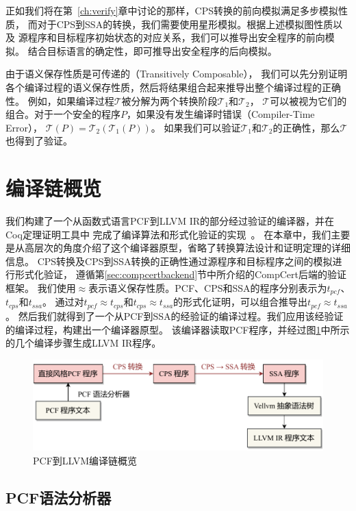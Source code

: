 正如我们将在第~\ref{ch:verify}章中讨论的那样，CPS转换的前向模拟满足多步模拟性质，
而对于CPS到SSA的转换，我们需要使用星形模拟。根据上述模拟图性质以及
源程序和目标程序初始状态的对应关系，我们可以推导出安全程序的前向模拟。
结合目标语言的确定性，即可推导出安全程序的后向模拟。

由于语义保存性质是可传递的（Transitively Composable），
我们可以先分别证明各个编译过程的语义保存性质，然后将结果组合起来推导出整个编译过程的正确性。
例如，如果编译过程$\mathcal{T}$被分解为两个转换阶段$\mathcal{T}_1$和$\mathcal{T}_2$，
$\mathcal{T}$可以被视为它们的组合。对于一个安全的程序$P$，如果没有发生编译时错误（Compiler-Time Error），
$\mathcal{T}(P) = \mathcal{T}_2(\mathcal{T}_1(P))$。
如果我们可以验证$\mathcal{T}_1$和$\mathcal{T}_2$的正确性，那么$\mathcal{T}$也得到了验证。

\section{编译链概览} \label{sec:overview}

我们构建了一个从函数式语言PCF到LLVM IR的部分经过验证的编译器，并在Coq定理证明工具中
完成了编译算法和形式化验证的实现~\cite{chlipala2022certified}。
在本章中，我们主要是从高层次的角度介绍了这个编译器原型，省略了转换算法设计和证明定理的详细信息。
CPS转换及CPS到SSA转换的正确性通过源程序和目标程序之间的模拟进行形式化验证，
遵循第\ref{sec:compcertbackend}节中所介绍的CompCert后端的验证框架。
我们使用$\approx $表示语义保存性质。PCF、CPS和SSA的程序分别表示为$t_{pcf}$、$t_{cps}$和$t_{ssa}$。
通过对$t_{pcf}\approx t_{cps}$和$t_{cps}\approx t_{ssa}$的形式化证明，可以组合推导出$t_{pcf}\approx t_{ssa}$。
然后我们就得到了一个从PCF到SSA的经验证的编译过程。我们应用该经验证的编译过程，构建出一个编译器原型。
该编译器读取PCF程序，并经过图\ref{overview}中所示的几个编译步骤生成LLVM IR程序。

\begin{figure}[htbp]
    \centering
    \includegraphics[width=0.8\linewidth]{figures/overview.pdf}
    \caption{PCF到LLVM编译链概览}\label{overview}
\end{figure}

\subsection{PCF语法分析器}

